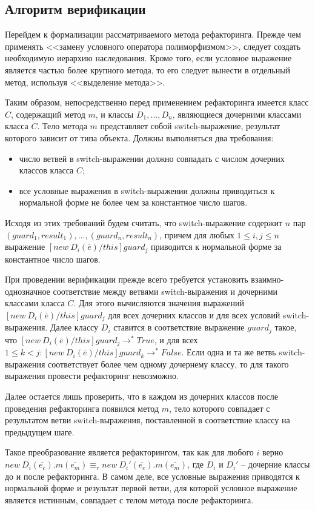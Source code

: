 \subsection{Алгоритм верификации}
Перейдем к формализации рассматриваемого метода рефакторинга. Прежде чем применять <<замену условного оператора полиморфизмом>>,
следует создать необходимую иерархию наследования. Кроме того, если условное выражение является частью более крупного метода,
то его следует вынести в отдельный метод, используя <<выделение метода>>.

Таким образом, непосредственно перед применением рефакторинга имеется класс $C$, содержащий метод $m$, и классы $D_1, \ldots, D_n$, являющиеся дочерними классами класса $C$.
Тело метода $m$ представляет собой switch-выражение, результат которого зависит от типа объекта.
Должны выполняться два требования:
\begin{itemize}
    \item число ветвей в switch-выражении должно совпадать с числом дочерних классов класса $C$;
    \item все условные выражения в switch-выражении должны приводиться к нормальной форме не более чем за константное число шагов.
\end{itemize}
Исходя из этих требований будем считать, что switch-выражение содержит $n$ пар $(guard_1, result_1), \ldots, (guard_n, result_n)$,
причем для любых $1 \le i, j \le n$ выражение $[new\ D_i(\overline{e})/this]guard_j$ приводится к нормальной форме за константное число шагов.

При проведении верификации прежде всего требуется установить взаимно-однозначное соответствие между ветвями switch-выражения и дочерними классами класса $C$.
Для этого вычисляются значения выражений $[new\ D_i(\overline{e})/this]guard_j$ для всех дочерних классов и для всех условий switch-выражения.
Далее классу $D_i$ ставится в соответствие выражение $guard_j$ такое, что $[new\ D_i(\overline{e})/this]guard_j \rightarrow^* True$,
и для всех $1 \le k < j: [new\ D_i(\overline{e})/this]guard_k \rightarrow^* False$. Если одна и та же ветвь switch-выражения соответствует более чем одному
дочернему классу, то для такого выражения провести рефакторинг невозможно.

Далее остается лишь проверить, что в каждом из дочерних классов после проведения рефакторинга появился метод $m$,
тело которого совпадает с результатом ветви switch-выражения, поставленной в соответствие классу на предыдущем шаге.

Такое преобразование является рефакторингом, так как для любого $i$ верно $new\ D_i(\overline{e_c}).m(\overline{e_m}) \equiv_r new\ D_i'(\overline{e_c}).m(\overline{e_m})$,
где $D_i$ и $D_i'$ -- дочерние классы до и после рефакторинга. В самом деле, все условные выражения приводятся к нормальной форме и результат первой ветви,
для которой условное выражение является истинным, совпадает с телом метода после рефакторинга.

